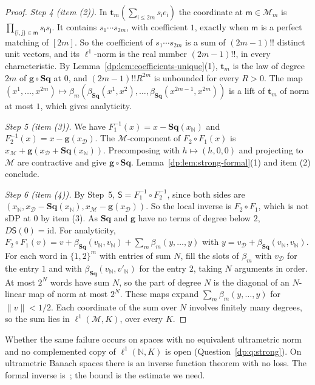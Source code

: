 \documentclass[11pt]{amsart}
\theoremstyle{definition}
\theoremstyle{remark}
\numberwithin{equation}{section}
\newcommand{\N}{\mathbb N}
\newcommand{\id}{\mathrm{id}}
\newcommand{\norm}[1]{\lVert #1\rVert}
\theoremstyle{plain}
\theoremstyle{definition}
\theoremstyle{plain}
\begin{document}
\begin{proof}
\emph{Step 4 (item (2)).} In $\mathbf t_m(\sum_{\mathsf i\le2m}s_{\mathsf i}e_{\mathsf i})$ the coordinate at $\mathsf m\in\mathcal M_m$ is $\prod_{\{\mathsf i,\mathsf j\}\in\mathsf m}s_{\mathsf i}s_{\mathsf j}$. It contains $s_1\cdots s_{2m}$, with coefficient $1$, exactly when $\mathsf m$ is a perfect matching of $[2m]$. So the coefficient of $s_1\cdots s_{2m}$ is a sum of $(2m-1)!!$ distinct unit vectors, and its $\ell^1$-norm is the real number $(2m-1)!!$, in every characteristic. By Lemma~\ref{dp:lem:coefficients-unique}(1), $\mathbf t_m$ is the law of degree $2m$ of $\mathbf g\circ\mathbf{Sq}$ at $0$, and $(2m-1)!!R^{2m}$ is unbounded for every $R>0$. The map $(x^1,\dots,x^{2m})\mapsto\beta_m(\beta_{\mathbf{Sq}}(x^1,x^2),\dots,\beta_{\mathbf{Sq}}(x^{2m-1},x^{2m}))$ is a lift of $\mathbf t_m$ of norm at most $1$, which gives analyticity.

\emph{Step 5 (item (3)).} We have $F_1^{-1}(x)=x-\mathbf{Sq}(x_\N)$ and $F_2^{-1}(x)=x-\mathbf g(x_{\mathcal D})$. The $\mathcal M$-component of $F_2\circ F_1(x)$ is $x_{\mathcal M}+\mathbf g(x_{\mathcal D}+\mathbf{Sq}(x_\N))$. Precomposing with $h\mapsto(h,0,0)$ and projecting to $\mathcal M$ are contractive and give $\mathbf g\circ\mathbf{Sq}$. Lemma~\ref{dp:lem:strong-formal}(1) and item (2) conclude.

\emph{Step 6 (item (4)).} By Step~5, $\mathsf S=F_1^{-1}\circ F_2^{-1}$, since both sides are $(x_\N,x_{\mathcal D}-\mathbf{Sq}(x_\N),x_{\mathcal M}-\mathbf g(x_{\mathcal D}))$. So the local inverse is $F_2\circ F_1$, which is not sDP at $0$ by item (3). As $\mathbf{Sq}$ and $\mathbf g$ have no terms of degree below $2$, $D\mathsf S(0)=\id$. For analyticity, $F_2\circ F_1(v)=v+\beta_{\mathbf{Sq}}(v_\N,v_\N)+\sum_m\beta_m(y,\dots,y)$ with $y=v_{\mathcal D}+\beta_{\mathbf{Sq}}(v_\N,v_\N)$. For each word in $\{1,2\}^m$ with entries of sum $N$, fill the slots of $\beta_m$ with $v_{\mathcal D}$ for the entry $1$ and with $\beta_{\mathbf{Sq}}(v_\N,v'_\N)$ for the entry $2$, taking $N$ arguments in order. At most $2^N$ words have sum $N$, so the part of degree $N$ is the diagonal of an $N$\nobreakdash-linear map of norm at most $2^N$. These maps expand $\sum_m\beta_m(y,\dots,y)$ for $\norm v<1/2$. Each coordinate of the sum over $N$ involves finitely many degrees, so the sum lies in $\ell^1(\mathcal M,K)$, over every $K$.
\end{proof}

Whether the same failure occurs on spaces with no equivalent ultrametric norm and no complemented copy of $\ell^1(\N,K)$ is open (Question~\ref{dp:q:strong}). On ultrametric Banach spaces there is an inverse function theorem with no loss. The formal inverse is~\cite[Th.~VI.3, Prop.~VI.8]{Ro}; the bound is the estimate we need.
\end{document}
